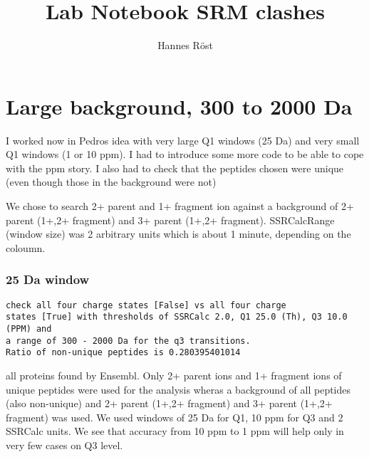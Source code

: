 

\usepackage{gensymb}
\usepackage{hyphenat}
\usepackage{subfig}

\usepackage{booktabs} %
\newcommand*\maketablespace{ \addlinespace[15pt] }



\author{Hannes Röst}
\title{Lab Notebook SRM clashes}
\maketitle

\tableofcontents

\section{Large background, 300 to 2000 Da}
I worked now in Pedros idea with very large Q1 windows (25 Da) and very
small Q1 windows (1 or 10 ppm). I had to introduce some more code to be
able to cope with the ppm story. I also had to check that the peptides
chosen were unique (even though those in the background were not)

We chose to search 2+ parent and 1+ fragment ion against a background of
2+ parent (1+,2+ fragment) and 3+ parent (1+,2+ fragment). SSRCalcRange
(window size) was 2 arbitrary units which is about 1 minute, depending
on the coloumn.

\subsubsection{25 Da window}

\begin{verbatim}
check all four charge states [False] vs all four charge 
states [True] with thresholds of SSRCalc 2.0, Q1 25.0 (Th), Q3 10.0 (PPM) and 
a range of 300 - 2000 Da for the q3 transitions. 
Ratio of non-unique peptides is 0.280395401014
\end{verbatim}

all proteins found by Ensembl. Only 2+ parent ions and 1+ fragment ions of
unique peptides were used for the analysis wheras a background of all peptides
(also non-unique) and 2+ parent (1+,2+ fragment) and 3+ parent (1+,2+ fragment)
was used.  We used windows of 25 Da for Q1, 10 ppm for Q3 and 2 SSRCalc units.
We see that accuracy from 10 ppm to 1 ppm will help only in very few cases on
Q3 level.

